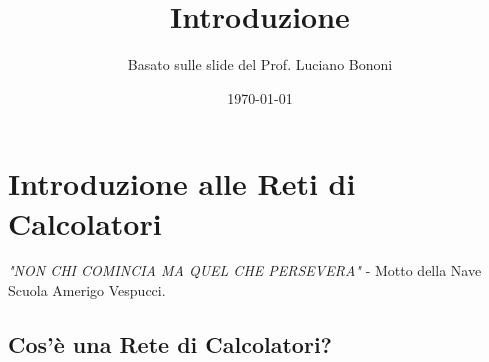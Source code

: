 

\title{Introduzione}
\author{Basato sulle slide del Prof. Luciano Bononi}
\date{\today}



\maketitle
\tableofcontents
\newpage

\section{Introduzione alle Reti di Calcolatori}

\textit{"NON CHI COMINCIA MA QUEL CHE PERSEVERA"} - Motto della Nave Scuola Amerigo Vespucci.

\subsection{Cos'è una Rete di Calcolatori?}
